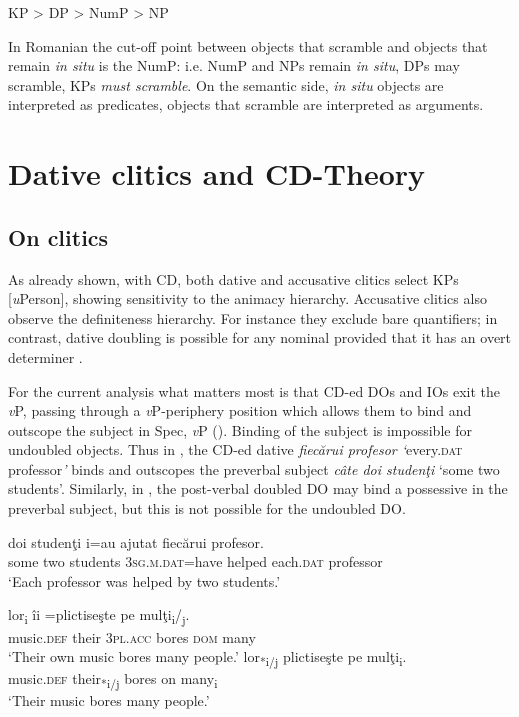 \documentclass[output=paper,colorlinks,citecolor=brown,nonflat]{langsci/langscibook}
\begin{document}
\ea%
      \label{ex:cornilescu:22}
        KP   >   DP   > NumP   > NP
      \z


In Romanian the cut-off point between objects that scramble and objects that remain \textit{in situ} is the NumP: i.e. NumP and NPs remain \textit{in situ}, DPs may scramble, KPs \textit{must scramble}. On the semantic side, \textit{in situ} objects are interpreted as predicates, objects that scramble are interpreted as arguments.

\section{Dative clitics and CD-Theory} %

\subsection{{On} {clitics}}

As already shown, with CD, both dative and accusative clitics select KPs [\textit{u}Person], showing sensitivity to the animacy hierarchy. Accusative clitics also observe the definiteness hierarchy. For instance they exclude bare quantifiers; in contrast, dative doubling is possible for any nominal provided that it has an overt determiner \citep{Cornilescu2017}.

For the current analysis what matters most is that CD-ed DOs and IOs exit the \textit{v}P, passing through a \textit{v}P-periphery position which allows them to bind and outscope the subject in Spec, \textit{v}P (\citealt{Dobrovie-Sorin1994, CornilescuDinuTigău2017DOC,Tigau2011}). Binding of the subject is impossible for undoubled objects. Thus in , the CD-ed dative \textit{fiecărui profesor ‘}every.\textsc{dat} professor\textit{’} binds and outscopes the preverbal subject \textit{câte doi studenţi} ‘some two students’. Similarly, in , the post-verbal doubled DO may bind a possessive in the preverbal subject, but this is not possible for the undoubled DO.

\ea%
      \label{ex:cornilescu:27}
       {doi} {studenţi} {i=au}  {ajutat} {fiecărui} {profesor}.\\
            some two students \textsc{3sg.m.dat}=have helped each.\textsc{dat} professor\\
      \glt ‘Each professor was helped by two students.’
      \z


\ea%
      \label{ex:cornilescu:28}
      \ea
       {lor\textsubscript{i}} {îi} {=plictiseşte}  {pe} mulţi\textsubscript{i}/\textsubscript{j}.\\
      		music.\textsc{def} their \textsc{3pl.acc} bores \textsc{dom} many\\
      \glt ‘Their own music bores many people.’
      \ex
       {lor\textsubscript{*i/j}}  {plictiseşte} {pe} {mulţi\textsubscript{i}}.	\\
      	 music.\textsc{def} their\textsubscript{*i/j} bores on many\textsubscript{i}\\
      \glt  ‘Their music bores many people.’
      \z
      \z
\end{document}
